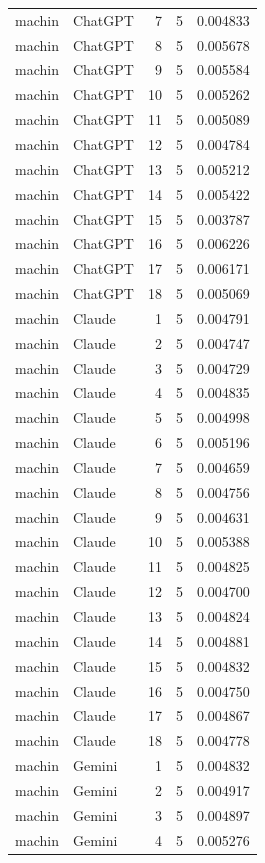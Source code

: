 \begin{longtable}{llrrr}
machin & ChatGPT & 7 & 5 & 0.004833\\
machin & ChatGPT & 8 & 5 & 0.005678\\
machin & ChatGPT & 9 & 5 & 0.005584\\
machin & ChatGPT & 10 & 5 & 0.005262\\
machin & ChatGPT & 11 & 5 & 0.005089\\
machin & ChatGPT & 12 & 5 & 0.004784\\
machin & ChatGPT & 13 & 5 & 0.005212\\
machin & ChatGPT & 14 & 5 & 0.005422\\
machin & ChatGPT & 15 & 5 & 0.003787\\
machin & ChatGPT & 16 & 5 & 0.006226\\
machin & ChatGPT & 17 & 5 & 0.006171\\
machin & ChatGPT & 18 & 5 & 0.005069\\
machin & Claude & 1 & 5 & 0.004791\\
machin & Claude & 2 & 5 & 0.004747\\
machin & Claude & 3 & 5 & 0.004729\\
machin & Claude & 4 & 5 & 0.004835\\
machin & Claude & 5 & 5 & 0.004998\\
machin & Claude & 6 & 5 & 0.005196\\
machin & Claude & 7 & 5 & 0.004659\\
machin & Claude & 8 & 5 & 0.004756\\
machin & Claude & 9 & 5 & 0.004631\\
machin & Claude & 10 & 5 & 0.005388\\
machin & Claude & 11 & 5 & 0.004825\\
machin & Claude & 12 & 5 & 0.004700\\
machin & Claude & 13 & 5 & 0.004824\\
machin & Claude & 14 & 5 & 0.004881\\
machin & Claude & 15 & 5 & 0.004832\\
machin & Claude & 16 & 5 & 0.004750\\
machin & Claude & 17 & 5 & 0.004867\\
machin & Claude & 18 & 5 & 0.004778\\
machin & Gemini & 1 & 5 & 0.004832\\
machin & Gemini & 2 & 5 & 0.004917\\
machin & Gemini & 3 & 5 & 0.004897\\
machin & Gemini & 4 & 5 & 0.005276\\

\end{longtable}
